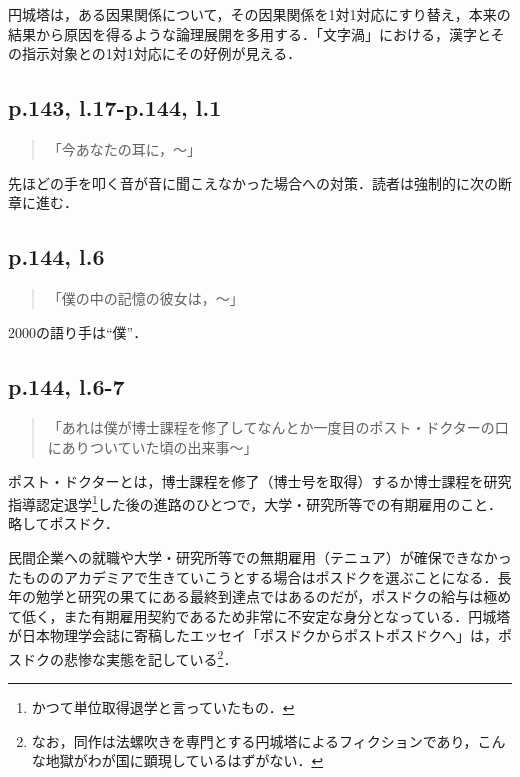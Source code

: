 \documentclass[10pt, a5paper, twoside]{ltjsarticle}
\begin{document}
            円城塔は，ある因果関係について，その因果関係を1対1対応にすり替え，本来の結果から原因を得るような論理展開を多用する．「文字渦」における，漢字とその指示対象との1対1対応にその好例が見える．

        \subsection{p.143, l.17-p.144, l.1}

            \begin{quote}
                「今あなたの耳に，〜」
            \end{quote}

            先ほどの手を叩く音が音に聞こえなかった場合への対策．読者は強制的に次の断章に進む．

        \subsection{p.144, l.6}

            \begin{quote}
                「僕の中の記憶の彼女は，〜」
            \end{quote}

            2000の語り手は“僕”．

        \subsection{p.144, l.6-7}

            \begin{quote}
                「あれは僕が博士課程を修了してなんとか一度目のポスト・ドクターの口にありついていた頃の出来事〜」
            \end{quote}

            ポスト・ドクターとは，博士課程を修了（博士号を取得）するか博士課程を研究指導認定退学\footnote{かつて単位取得退学と言っていたもの．}した後の進路のひとつで，大学・研究所等での有期雇用のこと．略してポスドク．

            民間企業への就職や大学・研究所等での無期雇用（テニュア）が確保できなかったもののアカデミアで生きていこうとする場合はポスドクを選ぶことになる．長年の勉学と研究の果てにある最終到達点ではあるのだが，ポスドクの給与は極めて低く，また有期雇用契約であるため非常に不安定な身分となっている．円城塔が日本物理学会誌に寄稿したエッセイ「ポスドクからポストポスドクへ」\cite{posdoc}は，ポスドクの悲惨な実態を記している\footnote{なお，同作は法螺吹きを専門とする円城塔によるフィクションであり，こんな地獄がわが国に顕現しているはずがない．}．
\end{document}
